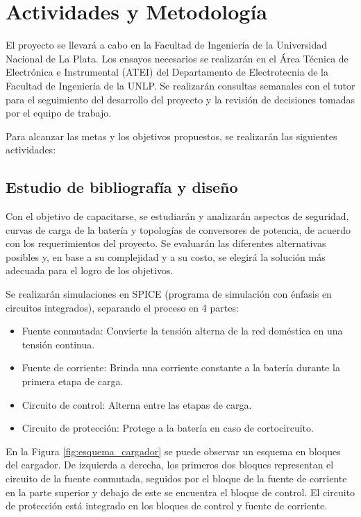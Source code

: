 \section{Actividades y Metodología}


El proyecto se llevará a cabo en la Facultad de Ingeniería de la Universidad Nacional de La Plata.
Los ensayos necesarios se realizarán en el Área Técnica de Electrónica e Instrumental (ATEI)
del Departamento de Electrotecnia de la Facultad de Ingeniería de la UNLP.
Se realizarán consultas semanales con el tutor para el seguimiento del desarrollo del proyecto y
la revisión de decisiones tomadas por el equipo de trabajo.

Para alcanzar las metas y los objetivos propuestos, se realizarán las siguientes actividades:

\subsection{Estudio de bibliografía y diseño}
Con el objetivo de capacitarse, se estudiarán y analizarán aspectos de seguridad, curvas de carga de la batería 
y topologías de conversores de potencia, de acuerdo con los requerimientos del proyecto. 
Se evaluarán las diferentes alternativas posibles y, en base a su complejidad y a su costo,
se elegirá la solución más adecuada para el logro de los objetivos. 

Se realizarán simulaciones en SPICE (programa de simulación con énfasis en circuitos integrados),
separando el proceso en 4 partes:
\begin{itemize}
    \item Fuente conmutada: Convierte la tensión alterna de la red doméstica en una tensión continua.
    \item Fuente de corriente: Brinda una corriente constante a la batería durante la primera etapa de carga.
    \item Circuito de control: Alterna entre las etapas de carga.
    \item Circuito de protección: Protege a la batería en caso de cortocircuito.
\end{itemize}

En la Figura \ref{fig:esquema_cargador} se puede observar un esquema en bloques del cargador.
De izquierda a derecha, los primeros dos bloques representan el circuito de la fuente conmutada,
seguidos por el bloque de la fuente de corriente en la parte superior y debajo de este se encuentra el bloque de control.
El circuito de protección está integrado en los bloques de control y fuente de corriente.

